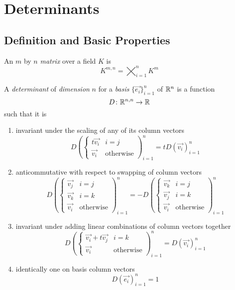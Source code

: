 \documentclass[notes]{subfiles}
\begin{document}
\setcounter{section}{4}
\section{Determinants}
\subsection{Definition and Basic Properties}
\begin{definition}[Matrix]
    An $m$ by $n$ \textit{matrix} over a field $K$ is
    \[
        K^{m, n} = \bigtimes_{i = 1}^n K^m
    \]
\end{definition}

\begin{definition}[Determinant]
    A \textit{determinant} of \textit{dimension} $n$ for a \textit{basis} $\{ \vec{e_i} \}_{i = 1}^n$ of $\mathbb{R}^n$ is a function
    \[
        D\colon \mathbb{R}^{n, n} \to \mathbb{R}
    \]
    such that it is
    \begin{enumerate}[label = (\arabic*)]
        \item invariant under the scaling of any of its column vectors
        \[
            D\left(\begin{cases} 
                t\vec{v_i} & i = j \\
                \vec{v_i} & \text{otherwise}
            \end{cases}
            \right)_{i = 1}^n = tD(\vec{v_i})_{i = 1}^n
        \]
        \item anticommutative with respect to swapping of column vectors
        \[
            D\left(\begin{cases}
                \vec{v_j} & i = j \\
                \vec{v_k} & i = k \\
                \vec{v_i} & \text{otherwise}
            \end{cases}\right)_{i = 1}^n
            =
            -D\left(\begin{cases}
                \vec{v_k} & i = j \\
                \vec{v_j} & i = k \\
                \vec{v_i} & \text{otherwise}
            \end{cases}\right)_{i = 1}^n
        \]
        \item invariant under adding linear combinations of column vectors together
        \[
            D\left(\begin{cases}
                \vec{v_i} + t\vec{v_j} & i = k \\
                \vec{v_i} & \text{otherwise}
            \end{cases}\right)_{i = 1}^n = D(\vec{v_i})_{i = 1}^n
        \]
        \item identically one on basis column vectors
        \[
            D(\vec{e_i})_{i = 1}^n = 1
        \]
    \end{enumerate}
\end{definition}
\end{document}
